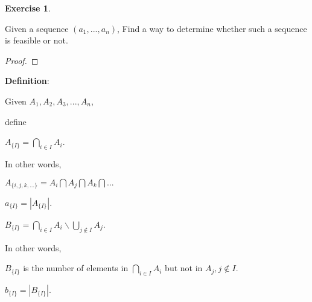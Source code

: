 \documentclass[12pt,a4]{article}
\theoremstyle{exercise}
\newtheorem{exercise}[theorem]{Exercise}
\begin{document}











\begin{exercise}
\end{exercise}
	Given a sequence $(a_1,...,a_n)$, Find a way to determine whether such a sequence is feasible or not.

\begin{proof}
\end{proof}

 \textbf{Definition}: 
 

     Given $A_1,A_2,A_3,...,A_n$, 
     
     define 
     \begin{center}
      $A_{\{I\}}=\bigcap \limits_{i \in I} A_i $. 
     \end{center} 

     In other words, 

     \begin{center}
      $A_{\{i,j,k,...\}}= A_i \bigcap A_j \bigcap A_k \bigcap ...$
      
      $a_{\{I\}}=|A_{\{I\}}|.$
     
      $B_{\{I\}}=\bigcap \limits_{i \in I} A_i \backslash \bigcup \limits_{j\notin I }{A_j}$.
     \end{center}
     
     In other words,
     \begin{center}
      $B_{\{I\}}$ is the number of elements in $\bigcap \limits_{i \in I} A_i$ but not in $A_j,j\notin I$.
     
      $b_{\{I\}}=|B_{\{I\}}|.$
     \end{center}
     
\end{document}
